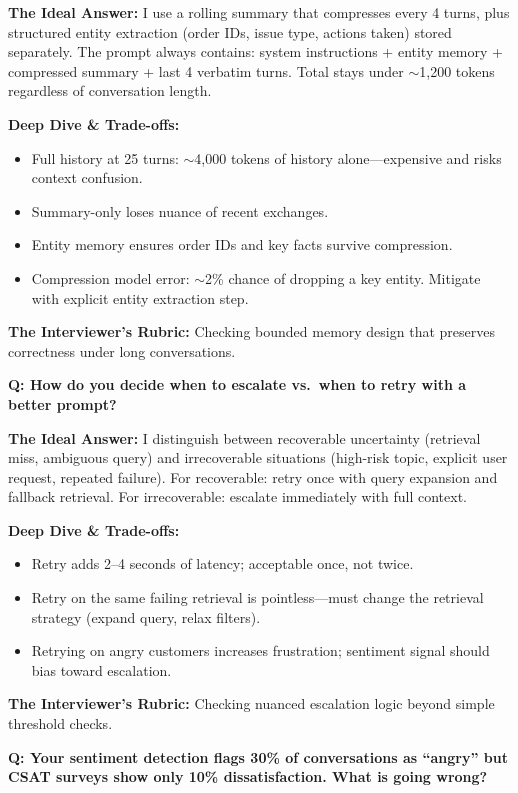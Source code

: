 \textbf{The Ideal Answer:} I use a rolling summary that compresses every 4 turns, plus structured entity extraction (order IDs, issue type, actions taken) stored separately. The prompt always contains: system instructions + entity memory + compressed summary + last 4 verbatim turns. Total stays under $\sim$1,200 tokens regardless of conversation length.

\textbf{Deep Dive \& Trade-offs:}
\begin{itemize}
  \item Full history at 25 turns: $\sim$4,000 tokens of history alone---expensive and risks context confusion.
  \item Summary-only loses nuance of recent exchanges.
  \item Entity memory ensures order IDs and key facts survive compression.
  \item Compression model error: $\sim$2\% chance of dropping a key entity. Mitigate with explicit entity extraction step.
\end{itemize}

\textbf{The Interviewer's Rubric:} Checking bounded memory design that preserves correctness under long conversations.

\textbf{Q: How do you decide when to escalate vs.\ when to retry with a better prompt?}

\textbf{The Ideal Answer:} I distinguish between recoverable uncertainty (retrieval miss, ambiguous query) and irrecoverable situations (high-risk topic, explicit user request, repeated failure). For recoverable: retry once with query expansion and fallback retrieval. For irrecoverable: escalate immediately with full context.

\textbf{Deep Dive \& Trade-offs:}
\begin{itemize}
  \item Retry adds 2--4 seconds of latency; acceptable once, not twice.
  \item Retry on the same failing retrieval is pointless---must change the retrieval strategy (expand query, relax filters).
  \item Retrying on angry customers increases frustration; sentiment signal should bias toward escalation.
\end{itemize}

\textbf{The Interviewer's Rubric:} Checking nuanced escalation logic beyond simple threshold checks.

\textbf{Q: Your sentiment detection flags 30\% of conversations as ``angry'' but CSAT surveys show only 10\% dissatisfaction. What is going wrong?}

